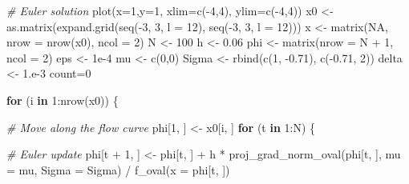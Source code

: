 \documentclass[
]{article}
\newenvironment{Shaded}{\begin{snugshade}}{\end{snugshade}}
\newcommand{\AttributeTok}[1]{\textcolor[rgb]{0.77,0.63,0.00}{#1}}
\newcommand{\CommentTok}[1]{\textcolor[rgb]{0.56,0.35,0.01}{\textit{#1}}}
\newcommand{\ConstantTok}[1]{\textcolor[rgb]{0.00,0.00,0.00}{#1}}
\newcommand{\ControlFlowTok}[1]{\textcolor[rgb]{0.13,0.29,0.53}{\textbf{#1}}}
\newcommand{\DecValTok}[1]{\textcolor[rgb]{0.00,0.00,0.81}{#1}}
\newcommand{\FloatTok}[1]{\textcolor[rgb]{0.00,0.00,0.81}{#1}}
\newcommand{\FunctionTok}[1]{\textcolor[rgb]{0.00,0.00,0.00}{#1}}
\newcommand{\NormalTok}[1]{#1}
\newcommand{\OtherTok}[1]{\textcolor[rgb]{0.56,0.35,0.01}{#1}}
\newcommand{\SpecialCharTok}[1]{\textcolor[rgb]{0.00,0.00,0.00}{#1}}
\begin{document}
\begin{Shaded}
\begin{Highlighting}[]
\CommentTok{\# Euler solution}
\FunctionTok{plot}\NormalTok{(}\AttributeTok{x=}\DecValTok{1}\NormalTok{,}\AttributeTok{y=}\DecValTok{1}\NormalTok{, }\AttributeTok{xlim=}\FunctionTok{c}\NormalTok{(}\SpecialCharTok{{-}}\DecValTok{4}\NormalTok{,}\DecValTok{4}\NormalTok{), }\AttributeTok{ylim=}\FunctionTok{c}\NormalTok{(}\SpecialCharTok{{-}}\DecValTok{4}\NormalTok{,}\DecValTok{4}\NormalTok{))}
\NormalTok{x0 }\OtherTok{\textless{}{-}} \FunctionTok{as.matrix}\NormalTok{(}\FunctionTok{expand.grid}\NormalTok{(}\FunctionTok{seq}\NormalTok{(}\SpecialCharTok{{-}}\DecValTok{3}\NormalTok{, }\DecValTok{3}\NormalTok{, }\AttributeTok{l =} \DecValTok{12}\NormalTok{), }\FunctionTok{seq}\NormalTok{(}\SpecialCharTok{{-}}\DecValTok{3}\NormalTok{, }\DecValTok{3}\NormalTok{, }\AttributeTok{l =} \DecValTok{12}\NormalTok{)))}
\NormalTok{x }\OtherTok{\textless{}{-}} \FunctionTok{matrix}\NormalTok{(}\ConstantTok{NA}\NormalTok{, }\AttributeTok{nrow =} \FunctionTok{nrow}\NormalTok{(x0), }\AttributeTok{ncol =} \DecValTok{2}\NormalTok{)}
\NormalTok{N }\OtherTok{\textless{}{-}} \DecValTok{100}
\NormalTok{h }\OtherTok{\textless{}{-}} \FloatTok{0.06}
\NormalTok{phi }\OtherTok{\textless{}{-}} \FunctionTok{matrix}\NormalTok{(}\AttributeTok{nrow =}\NormalTok{ N }\SpecialCharTok{+} \DecValTok{1}\NormalTok{, }\AttributeTok{ncol =} \DecValTok{2}\NormalTok{)}
\NormalTok{eps }\OtherTok{\textless{}{-}} \FloatTok{1e{-}4}
\NormalTok{mu }\OtherTok{\textless{}{-}} \FunctionTok{c}\NormalTok{(}\DecValTok{0}\NormalTok{,}\DecValTok{0}\NormalTok{)}
\NormalTok{Sigma }\OtherTok{\textless{}{-}} \FunctionTok{rbind}\NormalTok{(}\FunctionTok{c}\NormalTok{(}\DecValTok{1}\NormalTok{, }\SpecialCharTok{{-}}\FloatTok{0.71}\NormalTok{), }\FunctionTok{c}\NormalTok{(}\SpecialCharTok{{-}}\FloatTok{0.71}\NormalTok{, }\DecValTok{2}\NormalTok{))}
\NormalTok{delta }\OtherTok{\textless{}{-}} \DecValTok{1}\NormalTok{.e}\DecValTok{{-}3}
\NormalTok{count}\OtherTok{=}\DecValTok{0}

\ControlFlowTok{for}\NormalTok{ (i }\ControlFlowTok{in} \DecValTok{1}\SpecialCharTok{:}\FunctionTok{nrow}\NormalTok{(x0)) \{}
  
  \CommentTok{\# Move along the flow curve}
\NormalTok{  phi[}\DecValTok{1}\NormalTok{, ] }\OtherTok{\textless{}{-}}\NormalTok{ x0[i, ]}
  \ControlFlowTok{for}\NormalTok{ (t }\ControlFlowTok{in} \DecValTok{1}\SpecialCharTok{:}\NormalTok{N) \{}
    
    \CommentTok{\# Euler update}
\NormalTok{      phi[t }\SpecialCharTok{+} \DecValTok{1}\NormalTok{, ] }\OtherTok{\textless{}{-}}\NormalTok{ phi[t, ] }\SpecialCharTok{+} 
\NormalTok{        h }\SpecialCharTok{*} \FunctionTok{proj\_grad\_norm\_oval}\NormalTok{(phi[t, ], }\AttributeTok{mu =}\NormalTok{ mu, }\AttributeTok{Sigma =}\NormalTok{ Sigma) }\SpecialCharTok{/}
        \FunctionTok{f\_oval}\NormalTok{(}\AttributeTok{x =}\NormalTok{ phi[t, ])}
      

\end{Highlighting}
\end{Shaded}
\end{document}
